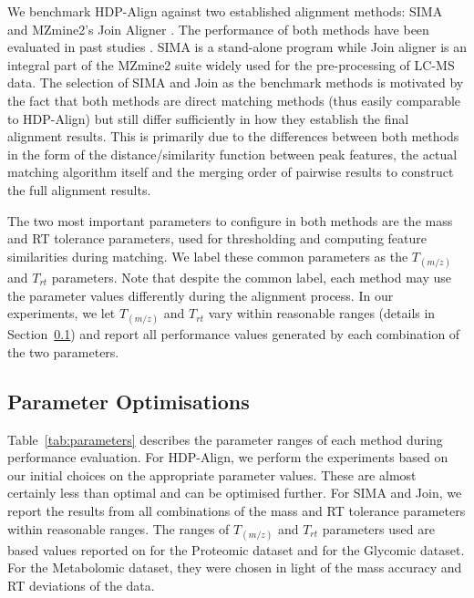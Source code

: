 We benchmark HDP-Align against two established alignment methods: SIMA \cite{Voss2011a} and MZmine2's Join Aligner \cite{Pluskal2010}. The performance of both methods have been evaluated in past studies \cite{Lange2008, Pluskal2010, Ballardini2011, Voss2011a, Tsai2013a}. SIMA is a stand-alone program while Join aligner is an integral part of the MZmine2 suite widely used for the pre-processing of LC-MS data. The selection of SIMA and Join as the benchmark methods is motivated by the fact that both methods are direct matching methods (thus easily comparable to HDP-Align) but still differ sufficiently in how they establish the final alignment results. This is primarily due to the differences between both methods in the form of the distance/similarity function between peak features, the actual matching algorithm itself and the merging order of pairwise results to construct the full alignment results.

The two most important parameters to configure in both methods are the mass and \ac{RT} tolerance parameters, used for thresholding and computing feature similarities during matching. We label these common parameters as the $T_{(m/z)}$ and $T_{rt}$ parameters. Note that despite the common label, each method may use the parameter values differently during the alignment process. In our experiments, we let $T_{(m/z)}$ and $T_{rt}$ vary within reasonable ranges (details in Section~\ref{sub:parameter-optimisations}) and report all performance values generated by each combination of the two parameters.

\subsection{Parameter Optimisations}
\label{sub:parameter-optimisations}

Table~\ref{tab:parameters} describes the parameter ranges of each method during performance evaluation. For HDP-Align, we perform the experiments based on our initial choices on the appropriate parameter values. These are almost certainly less than optimal and can be optimised further. For SIMA and Join, we report the results from all combinations of the mass and RT tolerance parameters within reasonable ranges. The ranges of $T_{(m/z)}$ and $T_{rt}$ parameters used are based values reported on \cite{Lange2008} for the Proteomic dataset and \cite{Tsai2013a} for the Glycomic dataset. For the Metabolomic dataset, they were chosen in light of the mass accuracy and RT deviations of the data.


